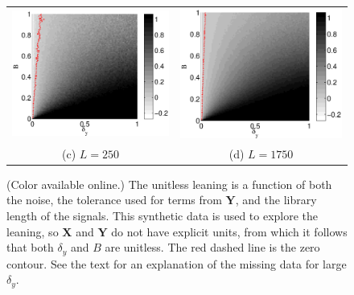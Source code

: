 \documentclass[twocolumn,aps,pre,groupedaddress]{revtex4-1}
\begin{document}
\begin{figure}[ht]
\begin{tabular}{cc}
\includegraphics[scale=0.30]{SimpleIRexample_diffLpart3.eps} &
\includegraphics[scale=0.30]{SimpleIRexample_diffLpart4.eps} \\
(c) $L=250$ & (d) $L=1750$ \\
\end{tabular}
\caption{(Color available online.) The unitless leaning is a function of both the noise, the tolerance used for terms from $\mathbf{Y}$, and the library length of the signals.  This synthetic data is used to explore the leaning, so $\mathbf{X}$ and $\mathbf{Y}$ do not have explicit units, from which it follows that both $\delta_y$ and $B$ are unitless.  The red dashed line is the zero contour.  See the text for an explanation of the missing data for large $\delta_y$.}
\label{fig:IRexChangeL}
\end{figure}
\end{document}
